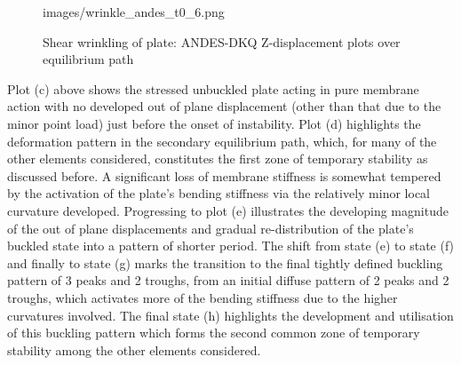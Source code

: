 \begin{figure}[H]
{	{images/wrinkle_andes_t0_6.png}}
	\\
	\caption{\label{wrinkle 3}Shear wrinkling of plate: ANDES-DKQ Z-displacement plots over equilibrium path}
\end{figure}

Plot (c) above shows the stressed unbuckled plate acting in pure membrane action with no developed out of plane displacement (other than that due to the minor point load) just before the onset of instability. Plot (d) highlights the deformation pattern in the secondary equilibrium path, which, for many of the other elements considered, constitutes the first zone of temporary stability as discussed before. A significant loss of membrane stiffness is somewhat tempered by the activation of the plate's bending stiffness via the relatively minor local curvature developed. Progressing to plot (e) illustrates the developing magnitude of the out of plane displacements and gradual re-distribution of the plate's buckled state into a pattern of shorter period. The shift from state (e) to state (f) and finally to state (g) marks the transition to the final tightly defined buckling pattern of 3 peaks and 2 troughs, from an initial diffuse pattern of 2 peaks and 2 troughs, which activates more of the bending stiffness due to the higher curvatures involved. The final state (h) highlights the development and utilisation of this buckling pattern which forms the second common zone of temporary stability among the other elements considered.

